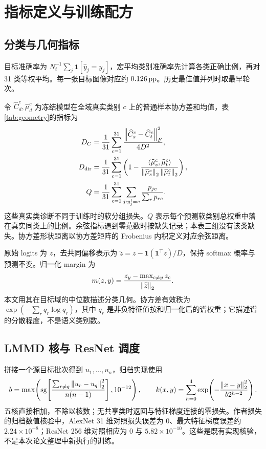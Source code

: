 \section{指标定义与训练配方}

\subsection{分类与几何指标}

目标准确率为 $N_t^{-1}\sum_j\mathbf1[\hat y_j=y_j]$，宏平均类别准确率先计算各类正确比例，再对 31 类等权平均。每一张目标图像对应约 $0.126\,\text{pp}$。历史最佳值并列时取最早轮次。

令 $\widehat C_d^c,\widehat\mu_d^c$ 为冻结模型在全域真实类别 $c$ 上的普通样本协方差和均值，表\ref{tab:geometry}的指标为
\begin{align*}
 D_C&=\frac1{31}\sum_{c=1}^{31}\frac{\left\lVert \widehat C_s^c-\widehat C_t^c\right\rVert_F^2}{4D^2},\\
 D_{\rm dir}&=\frac1{31}\sum_{c=1}^{31}
 \left(1-\frac{\langle\widehat\mu_s^c,\widehat\mu_t^c\rangle}
 {\left\lVert \widehat\mu_s^c\right\rVert_2\left\lVert \widehat\mu_t^c\right\rVert_2}\right),\\
 Q&=\frac1{31}\sum_{c=1}^{31}\sum_{j:y_j^t=c}
       \frac{p_{jc}}{\sum_rp_{rc}}.
\end{align*}
这些真实类诊断不同于训练时的软分组损失。$Q$ 表示每个预测软类别总权重中落在真实同类上的比例。余弦指标遇到零范数时按缺失记录；本表三组没有该类缺失。协方差形状距离以协方差矩阵的 Frobenius 内积定义对应余弦距离。

原始 logits 为 $z$，去共同偏移表示为 $\widetilde z=z-\mathbf1(\mathbf1^\top z)/D$，保持 softmax 概率与预测不变。归一化 margin 为
\begin{equation*}
 m(z,y)=\frac{z_y-\max_{c\ne y}z_c}{\left\lVert \widetilde z\right\rVert_2}.
\end{equation*}
本文用其在目标域的中位数描述分类几何。协方差有效秩为 $\exp(-\sum_r q_r\log q_r)$，其中 $q_r$ 是非负特征值按和归一化后的谱权重；它描述谱的分散程度，不是语义类别数。

\subsection{LMMD 核与 ResNet 调度}

拼接一个源目标批次得到 $u_1,\ldots,u_n$，归档实现使用
\begin{equation*}
 b=\max\!\left(\operatorname{sg}\!\left[\frac{\sum_{r\ne q}\left\lVert u_r-u_q\right\rVert_2^2}{n(n-1)}\right],10^{-12}\right),
 \qquad k(x,y)=\sum_{h=0}^{4}\exp\!\left(-\frac{\left\lVert x-y\right\rVert_2^2}{b2^{h-2}}\right).
\end{equation*}
五核直接相加，不除以核数；无共享类时返回与特征梯度连接的零损失。作者损失的归档数值核验中，AlexNet 31 维对照损失误差为 0、最大特征梯度误差约 $2.24\times10^{-8}$；ResNet 256 维对照相应为 0 与 $5.82\times10^{-10}$。这些是既有实现核验，不是本次论文整理中新执行的训练。

